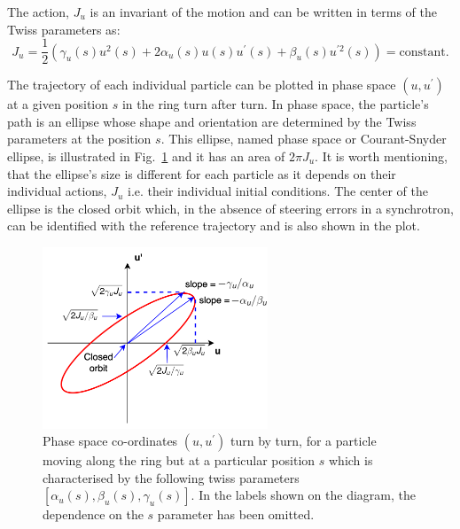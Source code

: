 The action, $J_u$ is an invariant of the motion and can be written in terms of the Twiss parameters as: %
\begin{equation}\label{eq:action_definition}
    J_u = \frac{1}{2} (\gamma_u(s) u^2(s) + 2 \alpha_u(s) u(s) u^\prime(s) + \beta_u(s) u^{\prime 2}(s)) = \mathrm{constant}.
\end{equation}

The trajectory of each individual particle can be plotted in phase space $(u, u^\prime)$ at a given position $s$ in the ring turn after turn. In phase space, the particle's path is an ellipse whose shape and orientation are determined by the Twiss parameters at the position $s$. This ellipse, named phase space or Courant-Snyder ellipse, is illustrated in Fig.~\ref{fig:phase_space_ellipse} and it has an area of $2\pi J_u$. It is worth mentioning, that the ellipse's size is different for each particle as it depends on their individual actions, $J_u$ i.e. their individual initial conditions. The center of the ellipse is the closed orbit which, in the absence of steering errors in a synchrotron, can be identified with the reference trajectory and is also shown in the plot.

\begin{figure}[!h] %
    \centering         
    \includegraphics[width=0.6\textwidth]{images/Ch2/phase_space_ellipse.png}
        \caption{Phase space co-ordinates $(u, u^\prime)$ turn by turn, for a particle moving along the ring but at a particular position $s$ which is characterised by the following twiss parameters $[\alpha_u(s), \beta_u(s), \gamma_u(s)]$. In the labels shown on the diagram, the dependence on the $s$ parameter has been omitted.}
        \label{fig:phase_space_ellipse}
 \end{figure}


